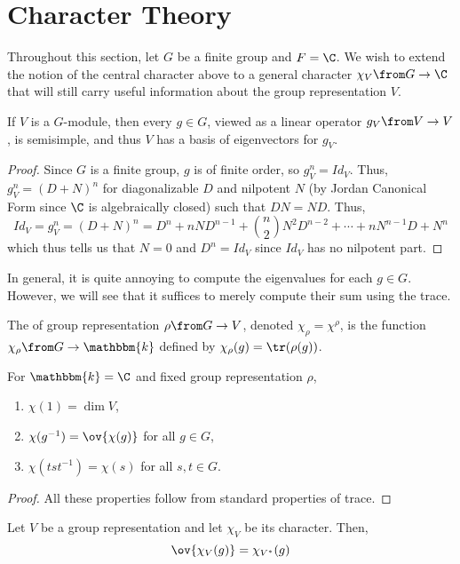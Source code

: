 \documentclass[11pt,leqno,oneside]{amsbook}
\newcommand{\bbk}{\mathbbm{k}}
\numberwithin{thm}{section}
\begin{document}
\section{Character Theory}
Throughout this section, let \(G\) be a finite group and \(F =
\C\). We wish to extend the notion of the central character above to a
general character \(\chi_V \from G \to \C\) that will still carry
useful information about the group representation \(V\).
\begin{prop}\label{g-is-ss}
  If \(V\) is a \(G\)-module, then every \(g \in G\), viewed as a
  linear operator \(g_V \from V \to V\), is semisimple, and thus \(V\)
  has a basis of eigenvectors for \(g_V\).
\end{prop}
\begin{proof}
  Since \(G\) is a finite group, \(g\) is of finite order, so \(g_V^n
  = Id_V\). Thus, \(g_V^n = (D+N)^n\) for diagonalizable \(D\) and
  nilpotent \(N\) (by Jordan Canonical Form since \(\C\) is
  algebraically closed) such that \(DN = ND\). Thus, \[
    Id_V = g_V^n = (D+N)^n = D^n + nND^{n-1} + \binom{n}{2} N^2 D^{n-2} +
    \cdots + nN^{n-1}D + N^n 
  \]
  which thus tells us that \(N = 0\) and \(D^n = Id_V\) since \(Id_V\)
  has no nilpotent part.
\end{proof}
In general, it is quite annoying to compute the eigenvalues for each
\(g \in G\). However, we will see that it suffices to merely compute
their sum using the trace. 
\begin{defn}
  The  of group representation \(\rho \from G \to V\), denoted \(\chi_\rho = \chi^\rho\), is the function
  \(\chi_\rho \from G \to \bbk\) defined by \(\chi_\rho(g) =
  \tr(\rho(g))\).
\end{defn}
\begin{prop}
  For \(\bbk = \C\) and fixed group representation \(\rho\),
  \begin{enumerate}
  \item \(\chi(1) = \dim V\),
  \item \(\chi(g^{-1}) = \ov{\chi(g)}\) for all \(g \in G\),
  \item \(\chi(tst^{-1}) = \chi(s)\) for all \(s,t \in G\).
  \end{enumerate}
\end{prop}
\begin{proof}
  All these properties follow from standard properties of trace.
\end{proof}
\begin{prop}\label{dual-character}
  Let \(V\) be a group representation and let \(\chi_V\) be its
  character. Then, \[
    \ov{\chi_V(g)} = \chi_{V^*}(g)
  \]
\end{prop}
\end{document}
